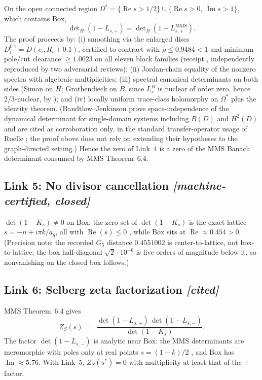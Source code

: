 \documentclass[11pt]{article}
\theoremstyle{definition}
\theoremstyle{remark}
\renewcommand{\Re}{\operatorname{Re}}
\renewcommand{\Im}{\operatorname{Im}}
\newcommand{\detH}{\det\nolimits_{H}}
\newcommand{\detB}{\det\nolimits_{B}}
\begin{document}
On the open connected region
$\Omega^* = \{\Re s > 1/2\} \cup \{\Re s > 0,\ \Im s > 1\}$, which
contains $\mathrm{Box}$,
\[
\detH(1 - L_{s,+}) = \detB(1 - L_{s,+}^{\mathrm{MMS}}).
\]
The proof \cite{R5Report} proceeds by: (i) smoothing via the enlarged
discs $D_i^{0.1} = D(c_i, R_i + 0.1)$, certified to contract with
$\hat\rho \le 0.9484 < 1$ and minimum pole/cut clearance
$\ge 1.0023$ on all eleven block families (receipt \cite{E1Receipt},
independently reproduced by two adversarial reviews); (ii) Jordan-chain
equality of the nonzero spectra with algebraic multiplicities;
(iii) spectral canonical determinants on both sides (Simon
\cite[Thm~4.2]{Simon77} on $H$; Grothendieck \cite[Thm~8]{Grothendieck52}
on $B$, since $L_s^{B}$ is nuclear of order zero, hence $2/3$-nuclear,
by \cite[Thm~4.10]{MMS}); and (iv) locally uniform trace-class
holomorphy on $\Omega^*$ plus the identity theorem.
(Bandtlow--Jenkinson \cite{BandtlowJenkinson08} prove
space-independence of the dynamical determinant for single-domain
systems including $B(D)$ and $H^2(D)$ and are cited as corroboration
only, in the standard transfer-operator usage of Ruelle
\cite{Ruelle76}; the proof above does not rely on extending their
hypotheses to the graph-directed setting.)
Hence the zero of
Link~4 is a zero of the MMS Banach determinant consumed by MMS
Theorem~6.4.

\subsection*{Link 5: No divisor cancellation \emph{[machine-certified, closed]}}

$\det(1 - K_s) \neq 0$ on $\mathrm{Box}$: the zero set of
$\det(1 - K_s)$ is the exact lattice $s = -n + i\pi k / a_q$, all with
$\Re(s) \le 0$ \cite{KSGate,KSCrosscheck,LeanV17}, while $\mathrm{Box}$
sits at $\Re \approx 0.454 > 0$. (Precision note: the recorded $G_5$
distance $0.4551002$ is center-to-lattice, not box-to-lattice; the box
half-diagonal $\sqrt2\cdot 10^{-6}$ is five orders of magnitude below
it, so nonvanishing on the closed box follows.)

\subsection*{Link 6: Selberg zeta factorization \emph{[cited]}}

MMS Theorem~6.4 \cite{MMS} gives
\[
Z_S(s) \;=\;
\frac{\det(1 - L_{s,+})\,\det(1 - L_{s,-})}{\det(1 - K_s)}.
\]
The factor $\det(1 - L_{s,-})$ is analytic near $\mathrm{Box}$: the MMS
determinants are meromorphic with poles only at real points
$s = (1-k)/2$ \cite[Thm~4.10]{MMS}, and $\mathrm{Box}$ has
$\Im \approx 5.76$. With Link~5, $Z_S(s^*) = 0$ with multiplicity at
least that of the $+$ factor.
\end{document}

